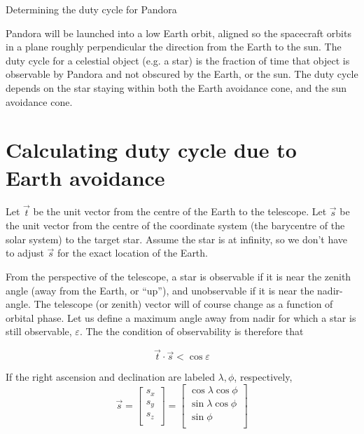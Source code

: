 \documentclass[11pt]{article}
\renewcommand{\hat}[1]{\ensuremath{\vec{#1}}}
\newcommand{\vareps}{\varepsilon}
\begin{document}
\begin{center}
\begin{Huge} Determining the duty cycle for Pandora \end{Huge}
\end{center}


Pandora will be launched into a low Earth orbit, aligned so the spacecraft orbits in a plane roughly perpendicular the direction from the Earth to the sun. The duty cycle for a celestial object (e.g. a star) is the fraction of time that object is observable by Pandora and not obscured by the Earth, or the sun. The duty cycle depends on the star staying within both the Earth avoidance cone, and the sun avoidance cone.


\section{Calculating duty cycle due to Earth avoidance}
Let \hat{t} be the unit vector from the centre of the Earth to the telescope.
Let \hat{s} be the unit vector from the centre of the coordinate system (the barycentre of the solar system) to the target star. Assume the star is at infinity, so we don't have to adjust \hat{s} for the exact location of the Earth.

From the perspective of the telescope, a star is observable if it is near the zenith angle (away from the Earth, or ``up''), and unobservable if it is near the nadir-angle. The telescope (or zenith) vector will of course change as a function of orbital phase.  Let us define a maximum angle away from nadir for which a star is still observable, $\vareps$. The the condition of observability is therefore that 

\begin{equation}
\hat{t} \cdot \hat{s} < \cos{\vareps}
\end{equation}


If the right ascension and declination are labeled $\lambda, \phi$, respectively, 
\begin{equation}
\hat{s} 
= 
\begin{bmatrix}
s_x\\
s_y\\
s_z\\
\end{bmatrix}
= 
\begin{bmatrix}
\cos{\lambda} \cos{\phi}\\
\sin{\lambda} \cos{\phi}\\
\sin{\phi} \\
\end{bmatrix}
\end{equation}
\end{document}
